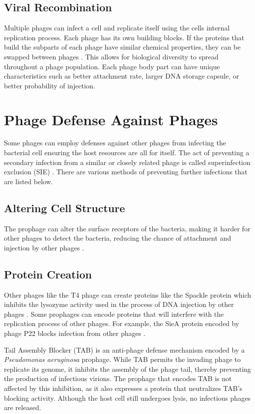 \subsection{Viral Recombination}
Multiple phages can infect a cell and replicate itself using the cells internal replication process. 
Each phage has its own building blocks. 
If the proteins that build the subparts of each phage have similar chemical properties, they can be swapped between phages \cite{aksyukBacteriophageAssembly2011}. 
This allows for biological diversity to spread throughout a phage population. 
Each phage body part can have unique characteristics such as better attachment rate, larger DNA storage capsule, or better probability of injection. 


\section{Phage Defense Against Phages}
Some phages can employ defenses against other phages from infecting the bacterial cell ensuring the host resources are all for itself. 
The act of preventing a secondary infection from a similar or closely related phage is called superinfection exclusion (SIE) \cite{patelAntiphageDefenceInhibition2024}. 
There are various methods of preventing further infections that are listed below. 

\subsection{Altering Cell Structure}
The prophage can alter the surface receptors of the bacteria, making it harder for other phages to detect the bacteria, reducing the chance of attachment and injection by other phages \cite{bucherPhageMachineSIEence2024}. 

\subsection{Protein Creation}
Other phages like the T4 phage can create proteins like the Spackle protein which inhibits the lysozyme activity used in the process of DNA injection by other phages \cite{bucherPhageMachineSIEence2024, kanamaruStructureFunctionT42020}. 
Some prophages can encode proteins that will interfere with the replication process of other phages. 
For example, the SieA protein encoded by phage P22 blocks infection from other phages \cite{leavittBacteriophageP22SieAmediated2024}. 

Tail Assembly Blocker (TAB) is an anti-phage defense mechanism encoded by a \textit{Pseudomonas aeruginosa} prophage. 
While TAB permits the invading phage to replicate its genome, it inhibits the assembly of the phage tail, thereby preventing the production of infectious virions. 
The prophage that encodes TAB is not affected by this inhibition, as it also expresses a protein that neutralizes TAB's blocking activity. 
Although the host cell still undergoes lysis, no infectious phages are released.

